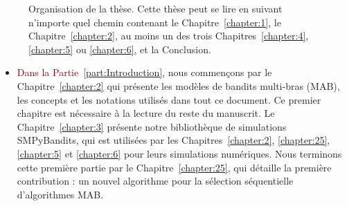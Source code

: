 \begin{resume_fr}
\begin{figure}[h!]
{
    }
    \caption[Organisation de la thèse : une carte de lecture.]{Organisation de la thèse. Cette thèse peut se lire en suivant n'importe quel chemin contenant le Chapitre~\ref{chapter:1}, le Chapitre~\ref{chapter:2}, au moins un des trois Chapitres~\ref{chapter:4}, \ref{chapter:5} ou \ref{chapter:6}, et la Conclusion.}
    \label{fig:1:organization_fr}
\end{figure}

\begin{itemize}
    \item
\textcolor{darkred}{Dans la Partie~\ref{part:Introduction}}, nous commençons par le Chapitre~\ref{chapter:2} qui présente les modèles de bandits multi-bras (MAB), les concepts et les notations utilisés dans tout ce document. Ce premier chapitre est nécessaire à la lecture du reste du manuscrit.
Le Chapitre~\ref{chapter:3} présente notre bibliothèque de simulations SMPyBandits, qui est utilisées par les Chapitres~\ref{chapter:2}, \ref{chapter:25}, \ref{chapter:5} et \ref{chapter:6} pour leurs simulations numériques.
Nous terminons cette première partie par le Chapitre~\ref{chapter:25},
qui détaille la première contribution : un nouvel algorithme pour la sélection séquentielle d'algorithmes MAB.


\end{itemize}
\end{resume_fr}
